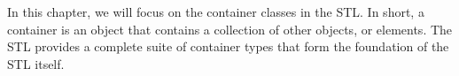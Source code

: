 In this chapter, we will focus on the container classes in the STL. In short, a container is an object that contains a collection of other objects, or elements. The STL provides a complete suite of container types that form the foundation of the STL itself.